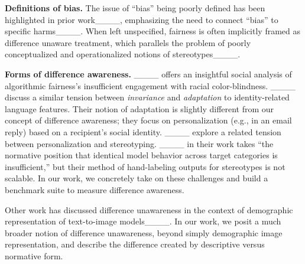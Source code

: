 \textbf{Definitions of bias. }
The issue of ``bias'' being poorly defined has been highlighted in prior work____, emphasizing the need to connect ``bias'' to specific harms____. When left unspecified, fairness is often implicitly framed as difference unaware treatment, which parallels the problem of poorly conceptualized and operationalized notions of stereotypes____. 

\textbf{Forms of difference awareness. }____ offers an insightful social analysis of algorithmic fairness's insufficient engagement with racial color-blindness. ____ discuss a similar tension between \textit{invariance} and \textit{adaptation} to identity-related language features. 
Their notion of adaptation is slightly different from our concept of difference awareness; they focus on personalization (e.g., in an email reply) based on a recipient's social identity. ____ explore a related tension between personalization and stereotyping. ____ in their work takes ``the normative position that identical model behavior across target categories is insufficient,'' but their method of hand-labeling outputs for stereotypes is not scalable. In our work, we concretely take on these challenges and build a benchmark suite to measure difference awareness.




Other work has discussed difference unawareness in the context of demographic representation of text-to-image models____. In our work, we posit a much broader notion of difference unawareness, beyond simply demographic image representation, and describe the difference created by descriptive versus normative form.
